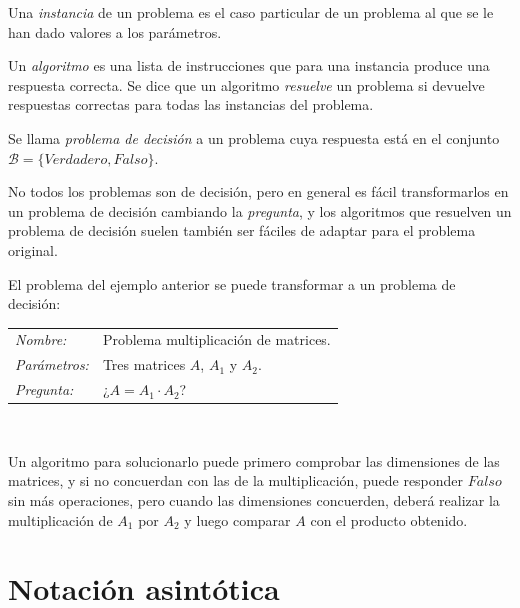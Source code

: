 \begin{definition}
	Una \textit{instancia} de un problema es el caso particular de un problema al que se le han dado valores a los parámetros.
\end{definition}


\begin{definition}	
	Un \textit{algoritmo} es una lista de instrucciones que para una instancia produce una respuesta correcta. Se dice que un algoritmo \textit{resuelve} un problema si devuelve respuestas correctas para todas las instancias del problema.
\end{definition}


\begin{definition}
	Se llama \textit{problema de decisión} a un problema cuya respuesta está en el conjunto $\mathcal{B}= \{Verdadero, Falso\}$.
\end{definition}


No todos los problemas son de decisión, pero en general es fácil transformarlos en un problema de decisión cambiando la \textit{pregunta}, y los algoritmos que resuelven un problema de decisión suelen también ser fáciles de adaptar para el problema original.

\begin{example}
	El problema del ejemplo anterior se puede transformar a un problema de decisión:
	
	\begin{tabular}{|ll}
		\textit{Nombre:} & Problema multiplicación de matrices. \\
		\textit{Parámetros:} & Tres matrices $A$, $A_1$ y $A_2$. \\
		\textit{Pregunta:} & ¿$ A = A_1 \cdot A_2$? \\
	\end{tabular}
	\\
	\hfil
	
	Un algoritmo para solucionarlo puede primero comprobar las dimensiones de las matrices, y si no concuerdan con las de la multiplicación, puede responder $Falso$ sin más operaciones, pero cuando las dimensiones concuerden, deberá realizar la multiplicación de $A_1$ por $A_2$ y luego comparar $A$ con el producto obtenido.
	
\end{example}

\hfil

\section{Notación asintótica} 

